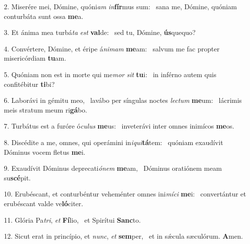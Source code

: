 2. Miserére mei, Dómine, quóni\textit{am} \textit{in}\textbf{fír}mus sum: \ast\  sana me, Dómine, quóniam conturbáta sunt ossa \textbf{me}a.\

3. Et ánima mea turbá\textit{ta} \textit{est} \textbf{val}de: \ast\  sed tu, Dómine, \textbf{ús}quequo?\

4. Convértere, Dómine, et éripe á\textit{ni}\textit{mam} \textbf{me}am: \ast\  salvum me fac propter misericórdiam \textbf{tu}am.\

5. Quóniam non est in morte qui me\textit{mor} \textit{sit} \textbf{tu}i: \ast\  in inférno autem quis confitébitur \textbf{ti}bi?\

6. Laborávi in gémitu meo, \dag\  lavábo per síngulas noctes \textit{lec}\textit{tum} \textbf{me}um: \ast\  lácrimis meis stratum meum ri\textbf{gá}bo.\

7. Turbátus est a furóre ó\textit{cu}\textit{lus} \textbf{me}us: \ast\  inveterávi inter omnes inimícos \textbf{me}os.\

8. Discédite a me, omnes, qui operámini in\textit{i}\textit{qui}\textbf{tá}tem: \ast\  quóniam exaudívit Dóminus vocem fletus \textbf{me}i.\

9. Exaudívit Dóminus deprecati\textit{ó}\textit{nem} \textbf{me}am, \ast\  Dóminus oratiónem meam su\textbf{scé}pit.\

10. Erubéscant, et conturbéntur veheménter omnes ini\textit{mí}\textit{ci} \textbf{me}i: \ast\  convertántur et erubéscant valde ve\textbf{ló}citer.\

11. Glória Pa\textit{tri}, \textit{et} \textbf{Fí}lio, \ast\  et Spirítui \textbf{Sanc}to.\

12. Sicut erat in princípio, et \textit{nunc}, \textit{et} \textbf{sem}per, \ast\  et in sǽcula sæculórum. \textbf{A}men.\

